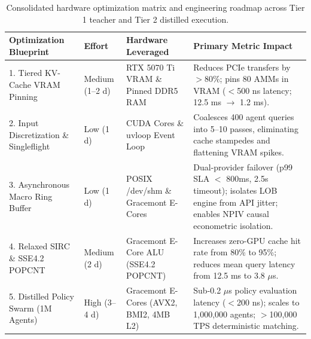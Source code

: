 \begin{table}[htbp]
\centering
\small
\begin{tabularx}{\textwidth}{p{3.0cm} l p{2.8cm} X}
\toprule
\textbf{Optimization Blueprint} & \textbf{Effort} & \textbf{Hardware Leveraged} & \textbf{Primary Metric Impact} \\
\midrule
1. Tiered KV-Cache VRAM Pinning & Medium (1--2 d) & RTX 5070 Ti VRAM \& Pinned DDR5 RAM & Reduces PCIe transfers by $>$80\%; pins 80 AMMs in VRAM ($<$500 ns latency; 12.5 ms $\to$ 1.2 ms). \\
2. Input Discretization \& Singleflight & Low (1 d) & CUDA Cores \& uvloop Event Loop & Coalesces 400 agent queries into 5--10 passes, eliminating cache stampedes and flattening VRAM spikes. \\
3. Asynchronous Macro Ring Buffer & Low (1 d) & POSIX /dev/shm \& Gracemont E-Cores & Dual-provider failover (p99 SLA $<$ 800ms, 2.5s timeout); isolates LOB engine from API jitter; enables NPIV causal econometric isolation. \\
4. Relaxed SIRC \& SSE4.2 POPCNT & Medium (2 d) & Gracemont E-Core ALU (SSE4.2 POPCNT) & Increases zero-GPU cache hit rate from 80\% to 95\%; reduces mean query latency from 12.5 ms to 3.8 $\mu$s. \\
5. Distilled Policy Swarm (1M Agents) & High (3--4 d) & Gracemont E-Cores (AVX2, BMI2, 4MB L2) & Sub-0.2 $\mu$s policy evaluation latency ($<$200 ns); scales to 1,000,000 agents; $>$100,000 TPS deterministic matching. \\
\bottomrule
\end{tabularx}
\caption{Consolidated hardware optimization matrix and engineering roadmap across Tier 1 teacher and Tier 2 distilled execution.}
\label{tab:hardware_optimization_matrix}
\end{table}
